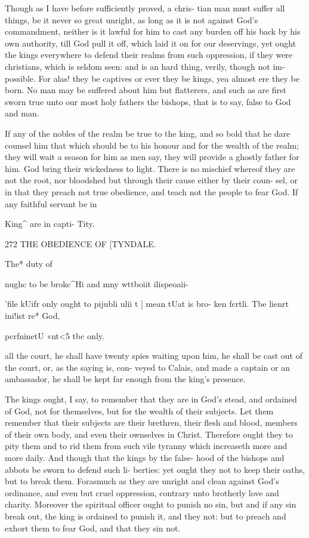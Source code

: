 \documentclass{custom}
\begin{document}
{Though as I have before sufficiently proved, a chris-
tian man must suffer all things, be it never so great unright,
as long as it is not against God's commandment, neither is
it lawful for him to cast any burden off his back by his
own authority, till God pull it off, which laid it on for our
deservings, yet ought the kings everywhere to defend their 
realms from such oppression, if they were christians, which 
is seldom seen: and is an hard thing, verily, though not im- 
possible. For alas! they be captives or ever they be kings, 
yea almost ere they be born. No man may be suffered 
about him but flatterers, and such as are first sworn true 
unto our most holy fathers the bishops, that is to say, false 
to God and man. 

If any of the nobles of the realm be true to the king, 
and so bold that he dare counsel him that which should be 
to his honour and for the wealth of the realm; they will 
wait a season for him as men say, they will provide a 
ghostly father for him. God bring their wickedness to 
light. There is no mischief whereof they are not the root, 
nor bloodshed but through their cause either by their coun- 
sel, or in that they preach not true obedience, and teach 
not the people to fear God. If any faithful servant be in 

King^ are 
in capti- 
Tity. 


272
THE OBEDIENCE OF
[TYNDALE.

The* duty of 

nughc to be 
brokc^Hi 
and mny 
wttboiit 
ilispeoaii- 

'file kUifr 
only ought 
to pijubli 
ulii t ] mean 
tUat is bro- 
ken fcrtli. 
Tbe lienrt 
ini!ist re* 
God, 

pcrfninetU 
«nt<5 tbc 
only. 

all the court, he shall have twenty spies waiting upon him, 
he shall be cast out of the court, or, as the saying is, con- 
veyed to Calais, and made a captain or an ambassador, he 
shall be kept far enough from the king's presence. 

The kings ought, I say, to remember that they are in 
God's stead, and ordained of God, not for themselves, but 
for the wealth of their subjects. Let them remember that 
their subjects are their brethren, their flesh and blood, 
members of their own body, and even their ownselves in 
Christ. Therefore ought they to pity them and to rid 
them from such vile tyranny which increaseth more and 
more daily. And though that the kings by the false- 
hood of the bishops and abbots be sworn to defend such li- 
berties: yet ought they not to keep their oaths, but to 
break them. Forasmuch as they are unright and clean 
against God's ordinance, and even but cruel oppression, 
contrary unto brotherly love and charity. Moreover the 
spiritual officer ought to punish no sin, but and if any sin 
break out, the king is ordained to punish it, and they not: 
but to preach and exhort them to fear God, and that they 
sin not. 

}
\end{document}
